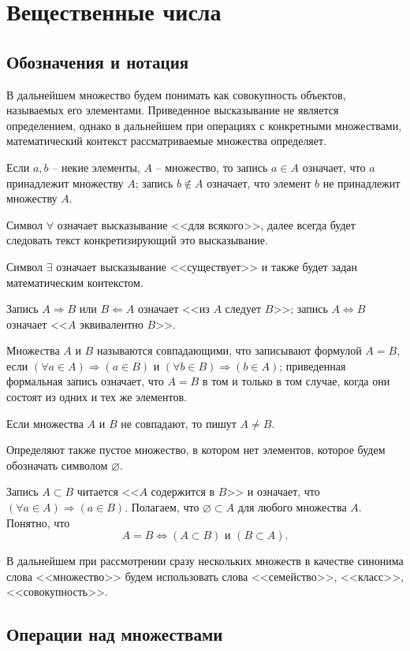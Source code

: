 \documentclass[main]{subfiles}
\begin{document}
\chapter{Вещественные числа}
\section{Обозначения и нотация}

В дальнейшем множество будем понимать как совокупность объектов, называемых
его элементами. Приведенное высказывание не является определением, однако в
дальнейшем при операциях с конкретными множествами, математический контекст
рассматриваемые множества определяет.

Если $a,b$ -- некие элементы, $A$ -- множество, то запись $a\in A$ означает,
что $a$ принадлежит множеству $A$; запись $b \not\in A$ означает,
что элемент $b$ не принадлежит множеству $A$.

Символ $\forall$ означает высказывание <<для всякого>>, далее всегда будет следовать
текст конкретизирующий это высказывание.

Символ $\exists$ означает высказывание <<существует>> и также будет задан
математическим контекстом.

Запись $A \Rightarrow B$ или $B \Leftarrow A$ означает <<из $A$ следует $B$>>;
запись $A \Leftrightarrow B$ означает <<$A$ эквивалентно $B$>>.

Множества $A$ и $B$ называются совпадающими, что записывают формулой $A=B$,
если $(\forall a \in A) \Rightarrow (a \in B)$ и
$(\forall b \in B) \Rightarrow (b \in A)$;
приведенная формальная запись означает, что $A=B$ в том и только в том случае,
когда они состоят из одних и тех же элементов.

Если множества $A$ и $B$ не совпадают, то пишут $A \neq B$.

Определяют также пустое множество, в котором нет элементов,
которое будем обозначать символом $\varnothing$.

Запись $A \subset B$ читается <<$A$ содержится в $B$>> и означает, что
$(\forall a \in A) \Rightarrow (a \in B)$. Полагаем, что $\varnothing \subset A$
для любого множества $A$. Понятно, что
\[A = B \Leftrightarrow (A \subset B) \text{ и } (B \subset A).\]

В дальнейшем при рассмотрении сразу нескольких множеств в качестве синонима
слова <<множество>> будем использовать слова <<семейство>>, <<класс>>,
<<совокупность>>.

\section{Операции над множествами}
\end{document}
